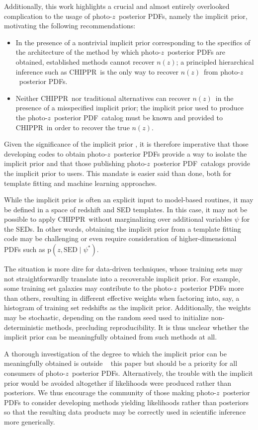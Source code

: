\documentclass[iop]{emulateapj}
\newcommand{\new}[2]{{\color{red}\sout{#1}}\ {\color{blue}{#2}}}%
\newcommand{\project}[1]{\textsc{#1}}
\newcommand{\Chippr}{\project{CHIPPR}}
\newcommand{\pr}[1]{\ensuremath{\mathrm{p}(#1)}}
\newcommand{\gvn}{\mid}
\newcommand{\pz}{photo-$z$}
\newcommand{\pzpdf}{\pz\ posterior PDF}
\newcommand{\nz}{$n(z)$}
\begin{document}
Additionally, this work highlights a crucial and almost entirely overlooked complication to the usage of \pzpdf s, namely the implicit prior, motivating the following recommendations: 
\begin{itemize}
\item In the presence of a nontrivial implicit prior corresponding to the specifics of the architecture of the method by which \pzpdf s are obtained, established methods cannot recover \nz;
a principled hierarchical inference such as \Chippr\ is the only way to recover \nz\ from \pzpdf s.
\item Neither \Chippr\ nor traditional alternatives can recover \nz\ in the presence of a misspecified implicit prior;
the implicit prior used to produce the \pzpdf\ catalog must be known and provided to \Chippr\ in order to recover the true \nz.
\end{itemize}
Given the significance of the implicit prior \citep{schmidt_evaluation_2020}, it is therefore imperative that those developing codes to obtain \pzpdf s provide a way to isolate the implicit prior and that those publishing \pzpdf\ catalogs provide the implicit prior to users.
This mandate is easier said than done, both for template fitting and machine learning approaches.

While the implicit prior is often an explicit input to model-based routines, it may be defined in a space of redshift and SED templates.
In this case, it may not be possible to apply \Chippr\ without marginalizing over additional variables $\psi$ for the SEDs.
In other words, obtaining the implicit prior from a template fitting code may be challenging or even require consideration of higher-dimensional PDFs such as $\pr{z, \mathrm{SED} \gvn \psi^{*}}$.

The situation is more dire for data-driven techniques, whose training sets may not straightforwardly translate into a recoverable implicit prior.
For example, some training set galaxies may contribute to the \pzpdf s more than others, resulting in different effective weights when factoring into, say, a histogram of training set redshifts as the implicit prior.
Additionally, the weights may be stochastic, depending on the random seed used to initialize non-deterministic methods, precluding reproducibility.
It is thus unclear whether the implicit prior can be meaningfully obtained from such methods at all.

A thorough investigation of the degree to which the implicit prior can be meaningfully obtained is outside \new{}{the scope of} this paper but should be a priority for all consumers of \pzpdf s.
Alternatively, the trouble with the implicit prior would be avoided altogether if likelihoods were produced rather than posteriors.
We thus encourage the community of those making \pzpdf s to consider developing methods yielding likelihoods rather than posteriors so that the resulting data products may be correctly used in scientific inference more generically.
\end{document}
